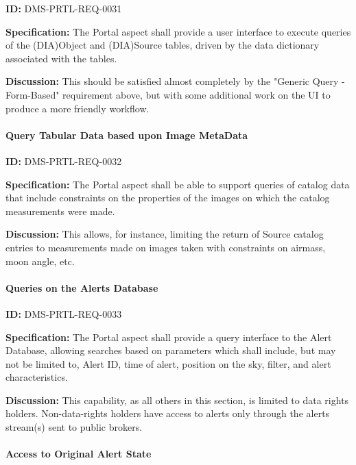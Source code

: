 \documentclass[SE,toc]{lsstdoc}
\begin{document}
\label{DMS-PRTL-REQ-0031}
\textbf{ID:} DMS-PRTL-REQ-0031

\textbf{Specification:}
The Portal aspect shall provide a user interface to execute queries of the (DIA)Object and (DIA)Source tables, driven by the data dictionary associated with the tables.

\textbf{Discussion:}
This should be satisfied almost completely by the "Generic Query - Form-Based" requirement above, but with some additional work on the UI to produce a more friendly workflow.

\paragraph{Query Tabular Data based upon Image MetaData}\hfill  %

\label{DMS-PRTL-REQ-0032}
\textbf{ID:} DMS-PRTL-REQ-0032

\textbf{Specification:}
The Portal aspect shall be able to support queries of catalog data that include constraints on the properties of the images on which the catalog measurements were made.

\textbf{Discussion:}
This allows, for instance, limiting the return of Source catalog entries to measurements made on images taken with constraints on airmass, moon angle, etc.

\paragraph{Queries on the Alerts Database}\hfill  %

\label{DMS-PRTL-REQ-0033}
\textbf{ID:} DMS-PRTL-REQ-0033

\textbf{Specification:}
The Portal aspect shall provide a query interface to the Alert Database, allowing searches based on parameters which shall include, but may not be limited to, Alert ID, time of alert, position on the sky, filter, and alert characteristics.

\textbf{Discussion:}
This capability, as all others in this section, is limited to data rights holders.  Non-data-rights holders have access to alerts only through the alerts stream(s) sent to public brokers.

\paragraph{Access to Original Alert State}\hfill  %
\end{document}
